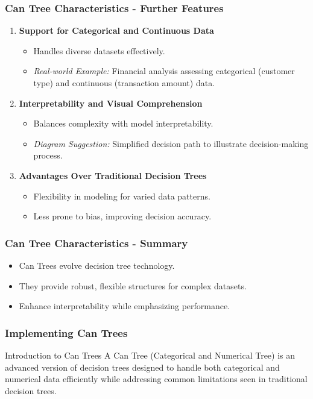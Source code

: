 \documentclass[aspectratio=169]{beamer}
\begin{document}
\begin{frame}[fragile]
    \frametitle{Can Tree Characteristics - Further Features}
    \begin{enumerate}[resume]
        \item \textbf{Support for Categorical and Continuous Data}
        \begin{itemize}
            \item Handles diverse datasets effectively.
            \item \textit{Real-world Example:} Financial analysis assessing categorical (customer type) and continuous (transaction amount) data.
        \end{itemize}
        
        \item \textbf{Interpretability and Visual Comprehension}
        \begin{itemize}
            \item Balances complexity with model interpretability.
            \item \textit{Diagram Suggestion:} Simplified decision path to illustrate decision-making process.
        \end{itemize}
        
        \item \textbf{Advantages Over Traditional Decision Trees}
        \begin{itemize}
            \item Flexibility in modeling for varied data patterns.
            \item Less prone to bias, improving decision accuracy.
        \end{itemize}
    \end{enumerate}
\end{frame}

\begin{frame}[fragile]
    \frametitle{Can Tree Characteristics - Summary}
    \begin{itemize}
        \item Can Trees evolve decision tree technology.
        \item They provide robust, flexible structures for complex datasets.
        \item Enhance interpretability while emphasizing performance.
    \end{itemize}
\end{frame}

\begin{frame}
    \frametitle{Implementing Can Trees}
    \begin{block}{Introduction to Can Trees}
        A Can Tree (Categorical and Numerical Tree) is an advanced version of decision trees designed to handle both categorical and numerical data efficiently while addressing common limitations seen in traditional decision trees.
    \end{block}
\end{frame}
\end{document}
